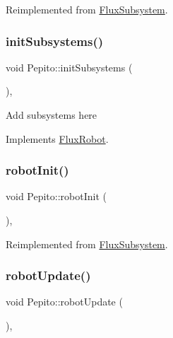 Reimplemented from \hyperlink{classFluxSubsystem_a5c39cb0f0834cc77a2b8f4f47778da87}{Flux\+Subsystem}.

\mbox{\label{classPepito_a420a3322a1fa658e9e40f277e7cc1c03}} 
\subsubsection{\texorpdfstring{init\+Subsystems()}{initSubsystems()}}
{\footnotesize\ttfamily void Pepito\+::init\+Subsystems (\begin{DoxyParamCaption}{ }\end{DoxyParamCaption})\hspace{0.3cm}{\ttfamily [override]}, {\ttfamily [virtual]}}

Add subsystems here 

Implements \hyperlink{classFluxRobot_aa5fcf98b4dfd539b1b49772381578dc8}{Flux\+Robot}.

\mbox{\label{classPepito_a1eed9bef768f3694d8bdfb4f610b8e3a}} 
\subsubsection{\texorpdfstring{robot\+Init()}{robotInit()}}
{\footnotesize\ttfamily void Pepito\+::robot\+Init (\begin{DoxyParamCaption}{ }\end{DoxyParamCaption})\hspace{0.3cm}{\ttfamily [override]}, {\ttfamily [virtual]}}



Reimplemented from \hyperlink{classFluxSubsystem_aacd5ddfcadda0866d5e838de09a60d63}{Flux\+Subsystem}.

\mbox{\label{classPepito_a0894a64d02550bb35b4e3eefa3ac4934}} 
\subsubsection{\texorpdfstring{robot\+Update()}{robotUpdate()}}
{\footnotesize\ttfamily void Pepito\+::robot\+Update (\begin{DoxyParamCaption}{ }\end{DoxyParamCaption})\hspace{0.3cm}{\ttfamily [override]}, {\ttfamily [virtual]}}



